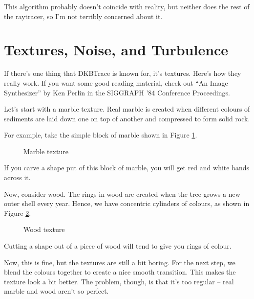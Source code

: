 This algorithm probably doesn't coincide with reality, but neither
does the rest of the raytracer, so I'm not terribly concerned about
it.

\section{Textures, Noise, and Turbulence}

If there's one thing that DKBTrace is known for, it's textures.  Here's how
they really work.  If you want some good reading material, check out ``An Image
Synthesizer'' by Ken Perlin in the SIGGRAPH '84 Conference Proceedings.

Let's start with a marble texture.  Real marble
is created when different colours of sediments are laid down one on
top of another and compressed to form solid rock.

For example, take the simple block of marble shown in Figure \ref{marble}.
\begin{figure}[htbp]
\begin{centering}

\caption{Marble texture}
\label{marble}
\end{centering}
\end{figure}
If you carve a shape put of this block of marble, you will get red and white
bands across it.

Now, consider wood.  The rings in wood are
created when the tree grows a new outer shell every year.  Hence, we
have concentric cylinders of colours, as shown in Figure \ref{log}.
\begin{figure}[htbp]
\begin{centering}

\caption{Wood texture}
\label{log}
\end{centering}
\end{figure}
Cutting a shape out of a piece of wood will tend to give you rings of colour.

Now, this is fine, but the textures are still a bit boring.  For the next
step, we blend the colours together to create a nice smooth transition.  This
makes the texture look a bit better.  The problem, though, is that it's too
regular -- real marble and wood aren't so perfect.

